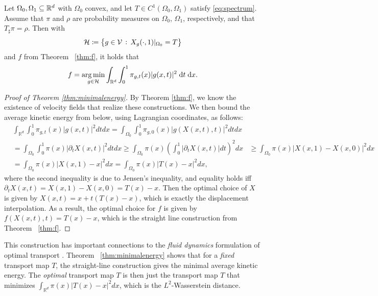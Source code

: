   \begin{theorem}\label{thm:minimalenergy}
    Let $\Omega_0, \Omega_1\subseteq\mathbb{R}^d$ with $\Omega_0$  convex,
    and let $T\in C^1(\Omega_0,\Omega_1)$ satisfy
    \eqref{eq:spectrum}. Assume that $\pi$ and $\rho$ are
    probability measures on $\Omega_0$, $\Omega_1$, respectively, and that
    $T_\sharp\pi = \rho$. Then with
\begin{equation*}
  \mathcal{H} \coloneqq \left\{g\in \mathcal{V}\, :\,X_g(\cdot,1)|_{\Omega_0}=T\right\}
\end{equation*}
and $f$ from Theorem ~\ref{thm:f}, it holds that
\begin{equation*}
  f = \argmin_{g\in\mathcal{H}}\int_{\mathbb{R}^d}\int_0^1\pi_{g,t}(x)|g(x,t)|^2\dd t\dd x.
\end{equation*}
  
  
 \end{theorem}
\begin{proof}[Proof of Theorem \ref{thm:minimalenergy}]
  By Theorem \ref{thm:f}, we know the existence of velocity fields
  that realize these constructions. We then bound the
  average kinetic energy from below, using Lagrangian coordinates, as follows:
  \begin{align*}
    &\int_{\mathbb{R}^d} \int_0^1 \pi_{g,t}(x)|g(x,t)|^2dtdx = \int_{\Omega_0} \int_0^1 \pi_{g,0}(x)|g(X(x,t),t)|^2dtdx\\
    &=\int_{\Omega_0} \int_0^1 \pi(x)|\partial_t X(x,t)|^2dtdx \geq \int_{\Omega_0} \pi(x) \left ( \int_0^1|\partial_t X(x,t)|dt \right )^2dx 
    &\geq \int_{\Omega_0} \pi(x)|X(x,1)- X(x,0)|^2dx\\
    &= \int_{\Omega_0} \pi(x)|X(x,1)-x|^2dx = \int_{\Omega_0} \pi(x)|T(x) -x|^2dx,
  \end{align*}
   where the second inequality
  is due to Jensen's inequality, and equality holds iff
  $\partial_t X(x,t) = X(x,1) - X(x,0) = T(x) - x$. Then the optimal
  choice of $X$ is given by $X(x,t) = x + t(T(x) - x)$, which is
  exactly the displacement interpolation. As a result, the optimal
  choice for $f$ is given by $f(X(x,t), t) = T(x) - x$, which is the
  straight line construction from Theorem ~\ref{thm:f}.
\end{proof}	






\begin{remark}
  This construction has important connections to the \emph{fluid dynamics} formulation of optimal transport \citep{OT-CFD}. Theorem ~\ref{thm:minimalenergy} shows that for a \emph{fixed} transport map $T$, the straight-line construction gives the minimal average kinetic energy. The \emph{optimal} transport map $T$ is then just the transport map
  $T$ that minimizes $\int_{\mathbb{R}^d} \pi(x)|T(x) -x|^2dx$, which
  is the $L^2$-Wasserstein distance.
\end{remark}


